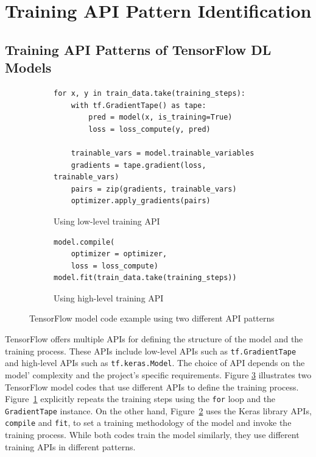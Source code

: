 \pagebreak
\section{Training API Pattern Identification}\label{sec:pattern}

\subsection{Training API Patterns of TensorFlow DL Models}

\renewcommand\tabularxcolumn[1]{m{#1}}
\begin{figure}[ht!]
\centering
  \begin{subfigure}[b]{\textwidth}
    \begin{lstlisting}[style=mpython]
for x, y in train_data.take(training_steps):
    with tf.GradientTape() as tape:
        pred = model(x, is_training=True)
        loss = loss_compute(y, pred)

    trainable_vars = model.trainable_variables
    gradients = tape.gradient(loss, trainable_vars)
    pairs = zip(gradients, trainable_vars)
    optimizer.apply_gradients(pairs)\end{lstlisting}
    \caption{Using low-level training API}
    \label{fig:pattern:ex01:a}
  \end{subfigure}
  \hspace{5mm}
  \begin{subfigure}[b]{\textwidth}
    \begin{lstlisting}[style=mpython]
model.compile(
    optimizer = optimizer, 
    loss = loss_compute) 
model.fit(train_data.take(training_steps))\end{lstlisting} 
    \caption{Using high-level training API}
    \label{fig:pattern:ex01:b}
  \end{subfigure}

  \caption{TensorFlow model code example using two different API patterns}
  \label{fig:pattern:ex01}
\end{figure}

TensorFlow offers multiple APIs for defining the structure of the model and the
training process. 
These APIs include low-level APIs such as {\tt tf.GradientTape} and high-level
APIs such as {\tt tf.keras.Model}.
The choice of API depends on the model' complexity and the project's specific
requirements.
Figure \ref{fig:pattern:ex01} illustrates two TensorFlow model codes that use
different APIs to define the training process. 
Figure~\ref{fig:pattern:ex01:a} explicitly repeats the training
steps using the {\tt for} loop and the {\tt GradientTape} instance. 
On the other hand, Figure~\ref{fig:pattern:ex01:b} uses the Keras
library APIs, {\tt compile} and {\tt fit}, to set a training methodology of the
model and invoke the training process. 
While both codes train the model similarly, they use different training
APIs in different patterns.

